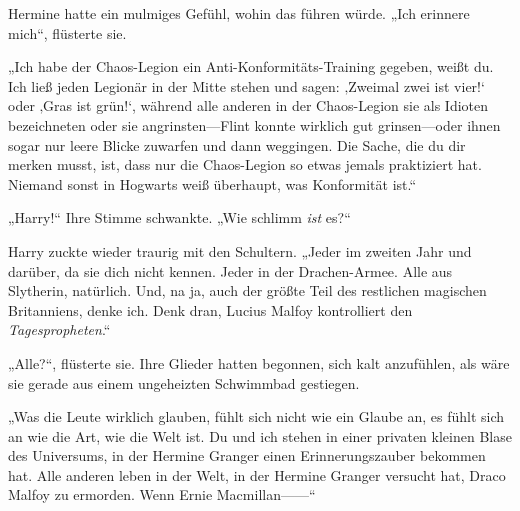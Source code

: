 Hermine hatte ein mulmiges Gefühl, wohin das führen würde.
„Ich erinnere mich“, flüsterte sie.

„Ich habe der Chaos-Legion ein Anti-Konformitäts-Training gegeben, weißt du. Ich ließ jeden Legionär in der Mitte stehen und sagen: ‚Zweimal zwei ist vier!‘ oder ‚Gras ist grün!‘, während alle anderen in der Chaos-Legion sie als Idioten bezeichneten oder sie angrinsten—Flint konnte wirklich gut grinsen—oder ihnen sogar nur leere Blicke zuwarfen und dann weggingen. Die Sache, die du dir merken musst, ist, dass nur die Chaos-Legion so etwas jemals praktiziert hat. Niemand sonst in Hogwarts weiß überhaupt, was Konformität ist.“

„Harry!“ Ihre Stimme schwankte. „Wie schlimm \emph{ist} es?“

Harry zuckte wieder traurig mit den Schultern. „Jeder im zweiten Jahr und darüber, da sie dich nicht kennen. Jeder in der Drachen-Armee. Alle aus Slytherin, natürlich. Und, na ja, auch der größte Teil des restlichen magischen Britanniens, denke ich. Denk dran, Lucius Malfoy kontrolliert den \emph{Tagespropheten}.“

„Alle?“, flüsterte sie. Ihre Glieder hatten begonnen, sich kalt anzufühlen, als wäre sie gerade aus einem ungeheizten Schwimmbad gestiegen.

„Was die Leute wirklich glauben, fühlt sich nicht wie ein Glaube an, es fühlt sich an wie die Art, wie die Welt ist. Du und ich stehen in einer privaten kleinen Blase des Universums, in der Hermine Granger einen Erinnerungszauber bekommen hat. Alle anderen leben in der Welt, in der Hermine Granger versucht hat, Draco Malfoy zu ermorden. Wenn Ernie Macmillan——“


